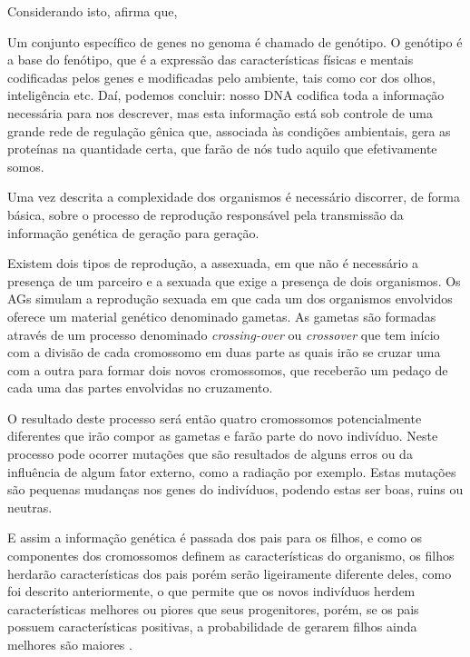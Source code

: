 \par Considerando isto,  afirma que,

\begin{citacao}
Um conjunto específico de genes no genoma é chamado de genótipo. O
genótipo é a base do fenótipo, que é a expressão das características
físicas e mentais codificadas pelos genes e modificadas pelo
ambiente, tais como cor dos olhos, inteligência etc. Daí, podemos concluir: nosso
DNA codifica toda a informação necessária para nos descrever, mas esta
informação está sob controle de uma grande rede de regulação gênica
que, associada às condições ambientais, gera as proteínas na quantidade
certa, que farão de nós tudo aquilo que efetivamente
somos.
\end{citacao}  

\par Uma vez descrita a complexidade dos organismos é necessário discorrer,
de forma básica, sobre o processo de reprodução responsável pela
transmissão da informação genética de geração para geração.

\par Existem dois tipos de reprodução, a assexuada, em que não é necessário a
presença de um parceiro e a sexuada que exige a presença de dois organismos.
Os AGs simulam a reprodução sexuada em que cada um dos organismos envolvidos
oferece um material genético denominado gametas. As gametas são formadas através de
um processo denominado \textit{crossing-over} ou \textit{crossover} que tem
início com a divisão de cada cromossomo em duas parte as quais 
irão se cruzar uma com a outra para formar dois novos cromossomos, que
receberão um pedaço de cada uma das partes envolvidas no cruzamento.

\par O resultado deste processo será então quatro cromossomos potencialmente
diferentes que irão compor as gametas e farão parte do novo indivíduo. Neste processo
pode ocorrer mutações que são resultados de alguns erros ou da influência
de algum fator externo, como a radiação por exemplo. Estas mutações são
pequenas mudanças nos genes do indivíduos, podendo estas ser boas, ruins ou neutras.


\par E assim a informação genética é passada dos pais para os filhos, e como os
componentes dos cromossomos definem as características do organismo, os filhos
herdarão características dos pais porém serão ligeiramente diferente deles, como
foi descrito anteriormente, o que permite que os novos indivíduos herdem
características melhores ou piores que seus progenitores, porém, se os pais
possuem características positivas, a probabilidade de gerarem filhos ainda
melhores são maiores \cite{livro_ags_ricardo_linden}.

